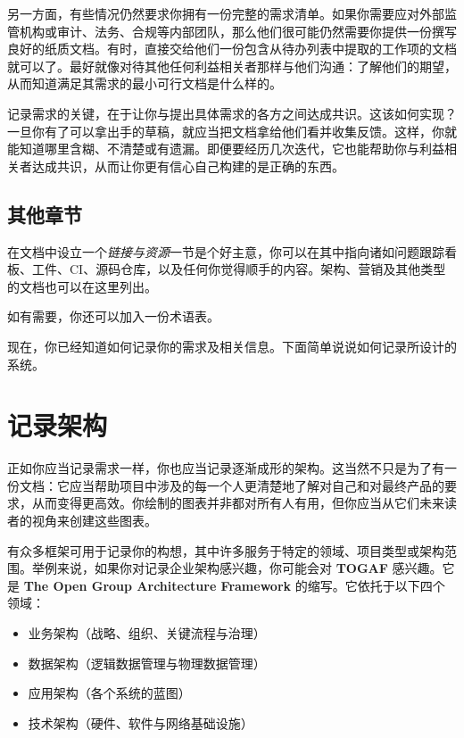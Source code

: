 \label{idx:179}
另一方面，有些情况仍然要求你拥有一份完整的需求清单。如果你需要应对外部监管机构或审计、法务、合规等内部团队，那么他们很可能仍然需要你提供一份撰写良好的纸质文档。有时，直接交给他们一份包含从待办列表中提取的工作项的文档就可以了。最好就像对待其他任何利益相关者那样与他们沟通：了解他们的期望，从而知道满足其需求的最小可行文档是什么样的。

记录需求的关键，在于让你与提出具体需求的各方之间达成共识。这该如何实现？一旦你有了可以拿出手的草稿，就应当把文档拿给他们看并收集反馈。这样，你就能知道哪里含糊、不清楚或有遗漏。即便要经历几次迭代，它也能帮助你与利益相关者达成共识，从而让你更有信心自己构建的是正确的东西。

\subsection{其他章节}

\label{idx:180}
在文档中设立一个\emph{链接与资源}一节是个好主意，你可以在其中指向诸如问题跟踪看板、工件、CI、源码仓库，以及任何你觉得顺手的内容。架构、营销及其他类型的文档也可以在这里列出。

如有需要，你还可以加入一份术语表。

\label{idx:181}
现在，你已经知道如何记录你的需求及相关信息。下面简单说说如何记录所设计的系统。

\section{记录架构}

\label{idx:182}
正如你应当记录需求一样，你也应当记录逐渐成形的架构。这当然不只是为了有一份文档：它应当帮助项目中涉及的每一个人更清楚地了解对自己和对最终产品的要求，从而变得更高效。你绘制的图表并非都对所有人有用，但你应当从它们未来读者的视角来创建这些图表。

\label{idx:183}
有众多框架可用于记录你的构想，其中许多服务于特定的领域、项目类型或架构范围。举例来说，如果你对记录企业架构感兴趣，你可能会对 \textbf{TOGAF} 感兴趣。它是 \textbf{The Open Group Architecture Framework} 的缩写。它依托于以下四个领域：

\begin{itemize}
\item 业务架构（战略、组织、关键流程与治理）
\item 数据架构（逻辑数据管理与物理数据管理）
\item 应用架构（各个系统的蓝图）
\item 技术架构（硬件、软件与网络基础设施）
\end{itemize}

